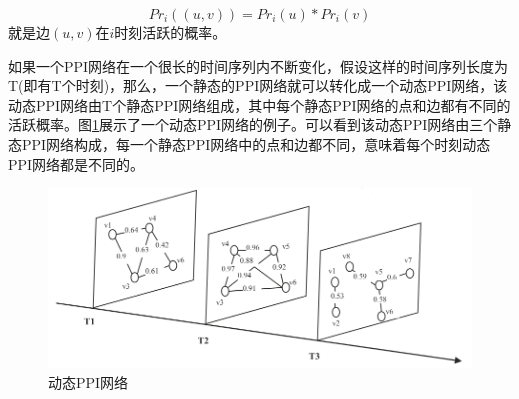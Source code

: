 \begin{equation}\label{dppi4}
Pr_i((u,v))= Pr_i(u)*Pr_i(v)
\end{equation}
就是边$(u,v)$在$i$时刻活跃的概率。

如果一个PPI网络在一个很长的时间序列内不断变化，假设这样的时间序列长度为T(即有T个时刻)，那么，一个静态的PPI网络就可以转化成一个动态PPI网络，该动态PPI网络由T个静态PPI网络组成，其中每个静态PPI网络的点和边都有不同的活跃概率。图\ref{fig:dppi}展示了一个动态PPI网络的例子。可以看到该动态PPI网络由三个静态PPI网络构成，每一个静态PPI网络中的点和边都不同，意味着每个时刻动态PPI网络都是不同的。

\begin{figure}[htbp]
\centering
\includegraphics[height=0.25\textheight]{pic/dppi.png}
\caption{动态PPI网络 \cite{zhang2016method} \label{fig:dppi}}
\end{figure}
